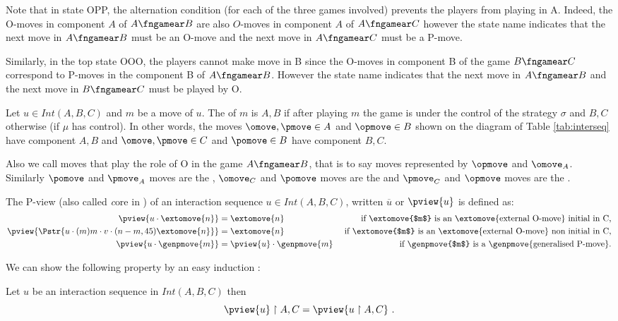 Note that in state OPP, the alternation condition (for each of the three games involved) prevents the players from playing in A. Indeed, the O-moves in component $A$ of $A\fngamear B$ are also $O$-moves in component $A$ of $A\fngamear C$ however the state name indicates that the next move in $A\fngamear B$ must be an O-move and the next move in $A\fngamear C$ must be a P-move.

Similarly, in the top state OOO, the players cannot make move in B since the O-moves in component B of the game $B\fngamear C$ correspond to P-moves in the component B of $A\fngamear B$. However the state name indicates that the next move in $A\fngamear B$ and the next move in $B\fngamear C$ must be played by O.


Let $u \in Int(A,B,C)$ and $m$ be a move of $u$.
The  of $m$ is $A,B$ if 
after playing $m$ the game is under the control 
of the strategy $\sigma$ and $B,C$ otherwise (if $\mu$ has control).
In other words, the moves $\omove, \pmove \in A$
and $\opmove \in B$ shown on the diagram of Table \ref{tab:interseq}
have component $A,B$ and 
$\omove, \pmove \in C$ and $\pomove \in B$
have component $B,C$.


Also we call 
moves that play the role of O in the game $A\fngamear B$, that is to say moves represented by $\opmove$ and $\omove_A$.
Similarly $\pomove$ and $\pmove_A$ moves are the ,
$\omove_C$ and $\pomove$ moves are
the 
and  $\pmove_C$ and $\opmove$ moves are the .

The P-view (also called {\emph core} in \cite{McCusker-GamesandFullAbstrac}) of an interaction sequence $u \in Int(A,B,C)$, written $\overline{u}$ or $\pview{u}$ is defined as:
\begin{align*}
\pview{u\cdot \extomove{n}} &= \extomove{n} &
\mbox{ if \extomove{$m$} is an \extomove{external O-move} initial in C,}\\
\pview{\Pstr{u\cdot (m)m\cdot v \cdot (n-m,45){\extomove{n}} }} &= \extomove{n} &\mbox{ if \extomove{$m$} is an \extomove{external O-move} non initial in C,}\\
\pview{u \cdot \genpmove{m}} &= \pview{u}\cdot \genpmove{m}  & \mbox{ if \genpmove{$m$} is a \genpmove{generalised P-move}.}\\ 
\end{align*}

We can show the following property by an easy induction :
\begin{lemma}
\label{lem:pviewAC_eq_ACpview}
 Let $u$ be an interaction sequence in $Int(A,B,C)$ then
$$\pview{u} \upharpoonright A,C = \pview{u \upharpoonright A,C} \ .$$
\end{lemma}

